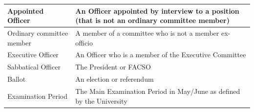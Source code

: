 \documentclass[12pt]{article}
\begin{document}
\begin{enumerate}
\begin{tabular}{|p{1.5in}|p{3.8in}|}
    Appointed Officer       & An Officer appointed by interview to a position (that is not an ordinary committee member) \\ \hline
    Ordinary committee member & A member of a committee who is not a member ex-officio \\ \hline
    Executive Officer       & An Officer who is a member of the Executive Committee \\ \hline
    Sabbatical Officer		& The President or FACSO\\\hline
    Ballot                  & An election or referendum \\ \hline
    Examination Period      & The Main Examination Period in May/June as defined by the University\\\hline
\end{tabular}
\end{enumerate}
\end{document}
